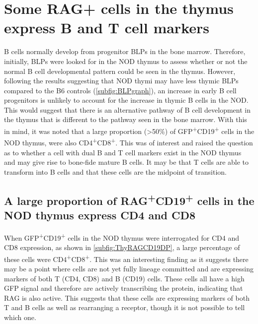 
\section{Some RAG+ cells in the thymus express B and T cell markers}

B cells normally develop from progenitor BLPs in the bone marrow.
Therefore, initially, BLPs were looked for in the NOD thymus to assess whether or not the normal B cell developmental pattern could be seen in the thymus.
However, following the results suggesting that NOD thymi may have less thymic BLPs compared to the B6 controls (\cref{subfig:BLPgraph}), an increase in early B cell progenitors is unlikely to account for the increase in thymic B cells in the NOD.
This would suggest that there is an alternative pathway of B cell development in the thymus that is different to the pathway seen in the bone marrow.
With this in mind, it was noted that a large proportion (>50\%) of GFP\textsuperscript{+}CD19\textsuperscript{+} cells in the NOD thymus, were also CD4\textsuperscript{+}CD8\textsuperscript{+}.
This was of interest and raised the question as to whether a cell with dual B and T cell markers exist in the NOD thymus and may give rise to bone-fide mature B cells.
It may be that T cells are able to transform into B cells and that these cells are the midpoint of transition.

\subsection{A large proportion of RAG\textsuperscript{+}CD19\textsuperscript{+} cells in the NOD thymus express CD4 and CD8}

When GFP\textsuperscript{+}CD19\textsuperscript{+} cells in the NOD thymus were interrogated for CD4 and CD8 expression, as shown in \cref{subfig:ThyRAGCD19DP}, a large percentage of these cells were CD4\textsuperscript{+}CD8\textsuperscript{+}.
This was an interesting finding as it suggests there may be a point where cells are not yet fully lineage committed and are expressing markers of both T (CD4, CD8) and B (CD19) cells.
These cells all have a high GFP signal and therefore are actively transcribing the protein, indicating that RAG is also active.
This suggests that these cells are expressing markers of both T and B cells as well as rearranging a receptor, though it is not possible to tell which one.

